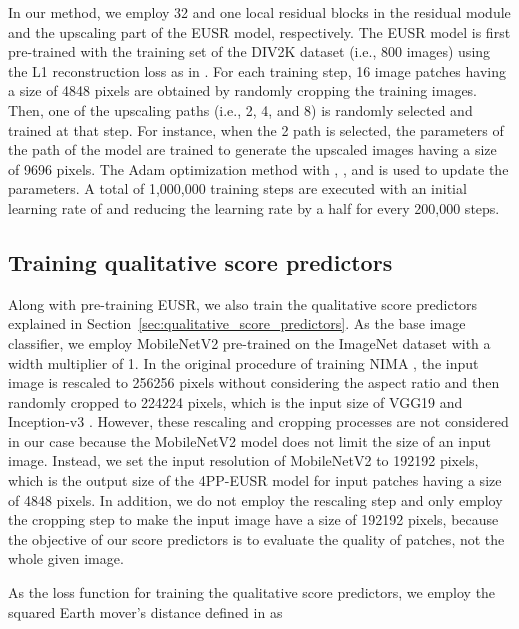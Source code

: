 \documentclass[runningheads]{llncs}
\begin{document}
In our method, we employ 32 and one local residual blocks in the residual module and the upscaling part of the EUSR model, respectively.
The EUSR model is first pre-trained with the training set of the DIV2K dataset \cite{timofte2018ntire} (i.e., 800 images) using the L1 reconstruction loss as in \cite{kim2018deep}.
For each training step, 16 image patches having a size of 4848 pixels are obtained by randomly cropping the training images.
Then, one of the upscaling paths (i.e., 2, 4, and 8) is randomly selected and trained at that step.
For instance, when the 2 path is selected, the parameters of the path of the model are trained to generate the upscaled images having a size of 9696 pixels.
The Adam optimization method \cite{kingma2014adam} with , , and  is used to update the parameters.
A total of 1,000,000 training steps are executed with an initial learning rate of  and reducing the learning rate by a half for every 200,000 steps.

\subsection{Training qualitative score predictors}

Along with pre-training EUSR, we also train the qualitative score predictors explained in Section~\ref{sec:qualitative_score_predictors}.
As the base image classifier, we employ MobileNetV2 \cite{sandler2018mobilenetv2} pre-trained on the ImageNet dataset \cite{russakovsky2015imagenet} with a width multiplier of 1.
In the original procedure of training NIMA \cite{talebi2018nima}, the input image is rescaled to 256256 pixels without considering the aspect ratio and then randomly cropped to 224224 pixels, which is the input size of VGG19 \cite{simonyan2014very} and Inception-v3 \cite{szegedy2016rethinking}.
However, these rescaling and cropping processes are not considered in our case because the MobileNetV2 model does not limit the size of an input image.
Instead, we set the input resolution of MobileNetV2 to 192192 pixels, which is the output size of the 4PP-EUSR model for input patches having a size of 4848 pixels.
In addition, we do not employ the rescaling step and only employ the cropping step to make the input image have a size of 192192 pixels, because the objective of our score predictors is to evaluate the quality of patches, not the whole given image.

As the loss function for training the qualitative score predictors, we employ the squared Earth mover's distance defined in \cite{hou2016squared} as
\end{document}
